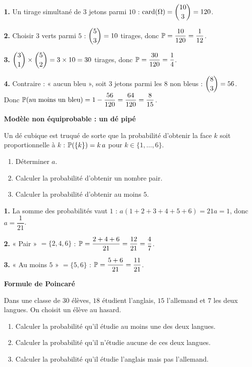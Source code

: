 \solution

\textbf{1.} Un tirage simultané de $3$ jetons parmi $10$ :
$\mathrm{card}(\Omega)=\dbinom{10}{3}=120$.

\textbf{2.} Choisir $3$ verts parmi $5$ : $\dbinom{5}{3}=10$ tirages, donc
$\mathbb{P} = \dfrac{10}{120}=\dfrac{1}{12}$.

\textbf{3.} $\dbinom{3}{1}\times\dbinom{5}{2}=3\times 10 = 30$ tirages, donc
$\mathbb{P} = \dfrac{30}{120}=\dfrac14$.

\textbf{4.} Contraire : « aucun bleu », soit $3$ jetons parmi les $8$ non
bleus : $\dbinom{8}{3}=56$. Donc
$\mathbb{P}(\text{au moins un bleu}) = 1-\dfrac{56}{120}=\dfrac{64}{120}=\dfrac{8}{15}$.

\exerciceresolu
\textbf{Modèle non équiprobable : un dé pipé}

Un dé cubique est truqué de sorte que la probabilité d'obtenir la face $k$
soit proportionnelle à $k$ : $\mathbb{P}(\{k\})=k\,a$ pour $k\in\{1,\ldots,6\}$.
\begin{enumerate}
	\item Déterminer $a$.
	\item Calculer la probabilité d'obtenir un nombre pair.
	\item Calculer la probabilité d'obtenir au moins $5$.
\end{enumerate}

\solution

\textbf{1.} La somme des probabilités vaut $1$ :
$a(1+2+3+4+5+6)=21a=1$, donc $a=\dfrac{1}{21}$.

\textbf{2.} « Pair » $=\{2,4,6\}$ :
$\mathbb{P} = \dfrac{2+4+6}{21}=\dfrac{12}{21}=\dfrac47$.

\textbf{3.} « Au moins $5$ » $=\{5,6\}$ :
$\mathbb{P} = \dfrac{5+6}{21}=\dfrac{11}{21}$.

\exerciceresolu
\textbf{Formule de Poincaré}

Dans une classe de $30$ élèves, $18$ étudient l'anglais, $15$ l'allemand et
$7$ les deux langues. On choisit un élève au hasard.
\begin{enumerate}
	\item Calculer la probabilité qu'il étudie au moins une des deux langues.
	\item Calculer la probabilité qu'il n'étudie aucune de ces deux langues.
	\item Calculer la probabilité qu'il étudie l'anglais mais pas l'allemand.
\end{enumerate}

\solution

